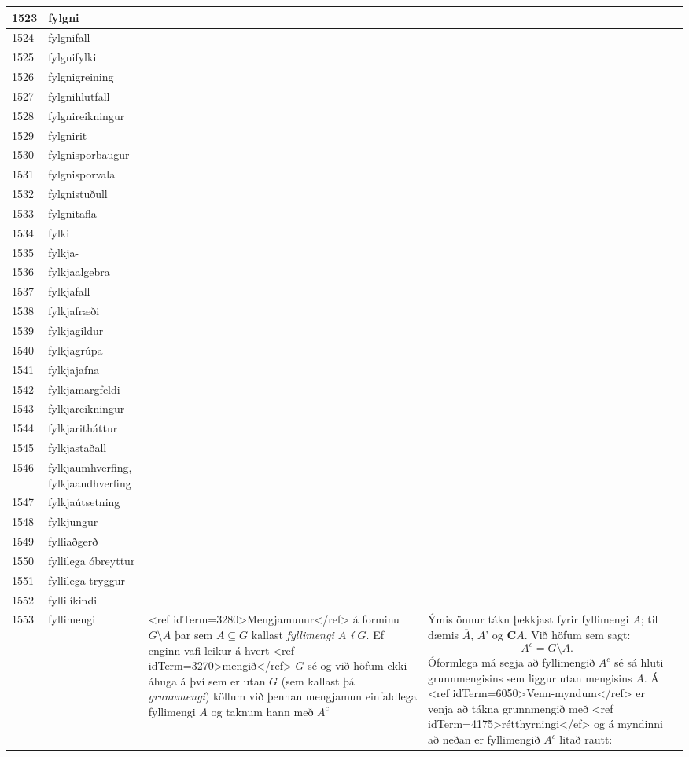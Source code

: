 \begin{longtable}{p{}|p{}|p{}|p{}|p{}}
\hline
1523 & fylgni &  &  &  \\
\hline
1524 & fylgnifall &  &  &  \\
\hline
1525 & fylgnifylki &  &  &  \\
\hline
1526 & fylgnigreining &  &  &  \\
\hline
1527 & fylgnihlutfall &  &  &  \\
\hline
1528 & fylgnireikningur &  &  &  \\
\hline
1529 & fylgnirit &  &  &  \\
\hline
1530 & fylgnisporbaugur &  &  &  \\
\hline
1531 & fylgnisporvala &  &  &  \\
\hline
1532 & fylgnistuðull &  &  &  \\
\hline
1533 & fylgnitafla &  &  &  \\
\hline
1534 & fylki &  &  &  \\
\hline
1535 & fylkja- &  &  &  \\
\hline
1536 & fylkjaalgebra &  &  &  \\
\hline
1537 & fylkjafall &  &  &  \\
\hline
1538 & fylkjafræði &  &  &  \\
\hline
1539 & fylkjagildur &  &  &  \\
\hline
1540 & fylkjagrúpa &  &  &  \\
\hline
1541 & fylkjajafna &  &  &  \\
\hline
1542 & fylkjamargfeldi &  &  &  \\
\hline
1543 & fylkjareikningur &  &  &  \\
\hline
1544 & fylkjaritháttur &  &  &  \\
\hline
1545 & fylkjastaðall &  &  &  \\
\hline
1546 & fylkjaumhverfing, fylkjaandhverfing &  &  &  \\
\hline
1547 & fylkjaútsetning &  &  &  \\
\hline
1548 & fylkjungur &  &  &  \\
\hline
1549 & fylliaðgerð &  &  &  \\
\hline
1550 & fyllilega óbreyttur &  &  &  \\
\hline
1551 & fyllilega tryggur &  &  &  \\
\hline
1552 & fyllilíkindi &  &  &  \\
\hline
1553 & fyllimengi & <ref idTerm=3280>Mengjamunur</ref> á forminu $G \setminus A$ þar sem $A \subseteq G$ kallast \textit{fyllimengi $A$ í $G$}. Ef enginn vafi leikur á hvert <ref idTerm=3270>mengið</ref> $G$ sé og við höfum ekki áhuga á því sem er utan $G$ (sem kallast þá \textit{grunnmengi}) köllum við þennan mengjamun einfaldlega fyllimengi $A$ og taknum hann með $A^c$ & Ýmis önnur tákn þekkjast fyrir fyllimengi $A$; til dæmis $\overline{A}$, $A’$ og $\mathbf{C}A$. Við höfum sem sagt: \[ A^c = G \setminus A. \] Óformlega má segja að fyllimengið $A^c$ sé sá hluti grunnmengisins sem liggur utan mengisins $A$. Á <ref idTerm=6050>Venn-myndum</ref> er venja að tákna grunnmengið með <ref idTerm=4175>rétthyrningi</ef> og á myndinni að neðan er fyllimengið $A^c$ litað rautt:


\end{longtable}
